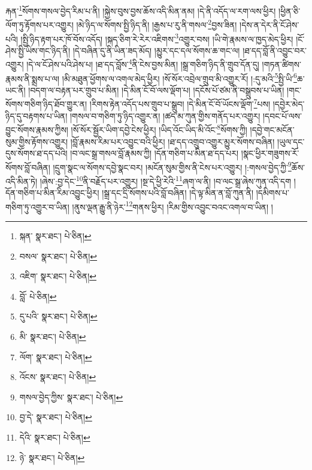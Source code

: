 རྐན་\footnote{སྐན་  སྣར་ཐང་།  པེ་ཅིན། }སོགས་གསལ་བྱེད་རིམ་པ་ནི། །སྐྱེས་བུས་བྱས་ཆོས་འདི་མིན་ནམ། །དེ་ནི་འདོད་ལ་རག་ལས་ཕྱིར། །ཕྱིན་ཅི་ལོག་ཏུ་རྟོགས་པར་འགྱུར། །མེ་ཉིད་ལ་སོགས་སྤྱི་ཉིད་ནི། །རྒྱས་པ་རུ་ནི་གསལ་\footnote{བསལ་  སྣར་ཐང་།  པེ་ཅིན། }བྱས་ཟིན། །དེས་ན་དེར་ནི་ངོ་ཤེས་པའི། །སྤྱི་ཉིད་རྟག་པར་ཁོ་བོས་འདོད། །སྐད་ཅིག་རེ་རེར་འཇིགས་\footnote{འཇིག་  སྣར་ཐང་།  པེ་ཅིན། }འགྱུར་བས། །ཡི་གེ་རྣམས་ལ་ཁྱད་མེད་ཕྱིར། །ངོ་ཤེས་སྤྱི་ཡིས་གང་ཉིད་ནི། །དེ་བཞིན་དུ་ནི་ཡིན་ཟད་མོད། །མྱུར་དང་དལ་སོགས་ཆ་གང་ལ། །ཐ་དད་བློ་ནི་འབྱུང་བར་འགྱུར། །དེ་ལ་ངོ་ཤེས་པའི་ཤེས་པ། །ཐ་དད་བློས་\footnote{བློ་  པེ་ཅིན། }ནི་ངེས་བྱས་མིན། །སྒྲ་གཅིག་ཉིད་ནི་གྲུབ་དོན་དུ། །གཏན་ཚིགས་རྣམས་ནི་སྨྲས་པ་ལ། །མི་མཐུན་ཕྱོགས་ལ་འགལ་མེད་ཕྱིར། །སོ་སོར་འབྲེལ་གྲུབ་མི་འགྱུར་རོ། །:དུ་མའི་\footnote{དུ་པའི་  སྣར་ཐང་།  པེ་ཅིན། }སྤྱི་ཡི་\footnote{མི་  སྣར་ཐང་།  པེ་ཅིན། }ཆ་ཡང་ནི། །བདག་ལ་བརྟན་པར་གྲུབ་པ་མིན། །དེ་མིན་ངོ་བོ་ལས་ལྡོག་པ། །དངོས་པོ་ཙམ་ནི་བསྒྲུབས་པ་ཡིན། །གང་སོགས་གཅིག་ཉིད་ཐོབ་གྱུར་ན། །རིགས་རྟེན་འདོད་པས་གྲུབ་པ་སྒྲུབ། །དེ་མིན་ངོ་བོ་ཡོངས་ལྡོག་\footnote{ལོག་  སྣར་ཐང་།  པེ་ཅིན། }པས། །དབྱེར་མེད་ཉིད་དུ་བརྟགས་པ་ཡིན། །གསལ་བ་གཅིག་ཏུ་ཉིད་འགྱུར་ན། །ཚད་མ་ཀུན་གྱིས་གནོད་པར་འགྱུར། །དབང་པོ་ལས་བྱུང་སོགས་རྣམས་ཀྱིས། །སོ་སོར་སྦྱོར་ཡིག་དབྱེ་ངེས་ཕྱིར། །ཡིད་འོང་ཡིད་མི་འོང་\footnote{འོངས་  སྣར་ཐང་།  པེ་ཅིན། }སོགས་ཀྱི། །དབྱེ་གང་མངོན་སུམ་གྱིས་རྟོགས་འགྱུར། །བློ་རྣམས་རིམ་པར་འབྱུང་བའི་ཕྱིར། །ཐ་དད་འགྲུབ་འགྱུར་མྱུར་སོགས་བཞིན། །ཡུལ་དང་དུས་སོགས་ཐ་དད་པའི། །བ་ལང་སྒྲ་གསལ་བློ་རྣམས་ཀྱི། །དོན་གཅིག་པ་མིན་ཐ་དད་པར། །སྣང་ཕྱིར་གཟུགས་རོ་སོགས་བློ་བཞིན། །དྲུག་སྣང་ལ་སོགས་དབྱེ་སྣང་བར། །མངོན་སུམ་གྱིས་ནི་ངེས་པར་འགྱུར། །:གསལ་བྱེད་ཀྱི་\footnote{གསལ་བྱེད་ཀྱིས་  སྣར་ཐང་།  པེ་ཅིན། }ཆོས་འདི་མིན་ཏེ། །ཞེས་:བྱ་དེང་\footnote{བྱ་དེ་  སྣར་ཐང་།  པེ་ཅིན། }ནི་བརྗོད་པར་འགྱུར། །སྔ་དེ་ཕྱི་རེའི་\footnote{དེའི་  སྣར་ཐང་།  པེ་ཅིན། }ཞག་ལ་ནི། །བ་ལང་སྒྲ་ཞེས་ཀུན་འདི་དག །དོན་གཅིག་པ་མིན་རིམ་འབྱུང་ཕྱིར། །སྒྲ་དང་དྲི་སོགས་པའི་བློ་བཞིན། །དེ་ལྟ་མིན་ན་བློ་ཀུན་ནི། །དམིགས་པ་གཅིག་ཏུ་འགྱུར་བ་ཡིན། །ནུས་ལྡན་རྒྱུ་ནི་ཉེར་\footnote{ཉེ་  སྣར་ཐང་།  པེ་ཅིན། }གནས་ཕྱིར། །རིམ་གྱིས་འབྱུང་བའང་འགལ་བ་ཡིན། །
